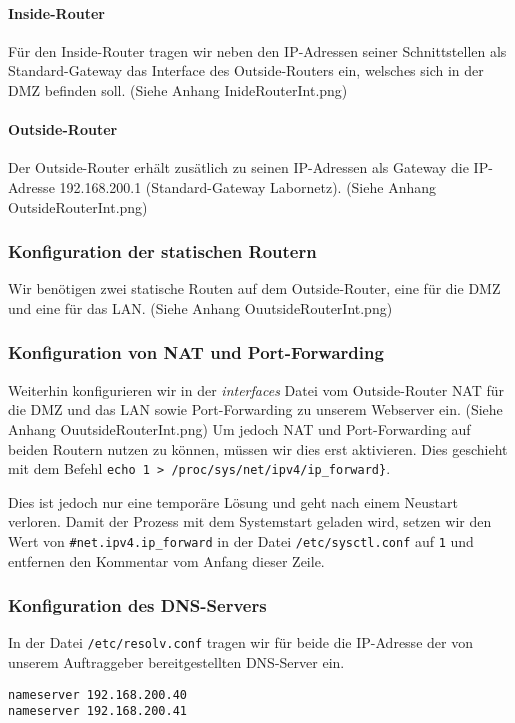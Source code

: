 \paragraph*{Inside-Router} Für den Inside-Router tragen wir neben den \ac{IP}-Adressen seiner Schnittstellen als Standard-Gateway das Interface des Outside-Routers ein, welsches sich in der \ac{DMZ} befinden soll. (Siehe Anhang InideRouterInt.png)

\paragraph*{Outside-Router} Der Outside-Router erhält zusätlich zu seinen \ac{IP}-Adressen als Gateway die \ac{IP}-Adresse 192.168.200.1 (Standard-Gateway Labornetz). (Siehe Anhang OutsideRouterInt.png)

\subsubsection{Konfiguration der statischen Routern}
\label{subsubsec:KonfigurationStatischeRouten}
Wir benötigen zwei statische Routen auf dem Outside-Router, eine für die \ac{DMZ} und eine für das \ac{LAN}. (Siehe Anhang OuutsideRouterInt.png)

\subsubsection{Konfiguration von \ac{NAT} und Port-Forwarding}
\label{subsubsec:KonfigurationNAT}
Weiterhin konfigurieren wir in der \textit{interfaces} Datei vom Outside-Router \ac{NAT} für die \ac{DMZ} und das \ac{LAN} sowie Port-Forwarding zu unserem Webserver ein. (Siehe Anhang OuutsideRouterInt.png)
Um jedoch \ac{NAT} und Port-Forwarding auf beiden Routern nutzen zu können, müssen wir dies erst aktivieren. Dies geschieht mit dem Befehl
\verb+echo 1 > /proc/sys/net/ipv4/ip_forward}+.

Dies ist jedoch nur eine temporäre Lösung und geht nach einem Neustart verloren. Damit der Prozess mit dem Systemstart geladen wird, setzen wir den Wert von  \verb+#net.ipv4.ip_forward+ in der Datei \texttt{/etc/sysctl.conf} auf \verb+1+ und entfernen den Kommentar vom Anfang dieser Zeile.

\subsubsection{Konfiguration des \ac{DNS}-Servers}
\label{subsubsec:KonfigurationLinuxDNS}
In der Datei \verb+/etc/resolv.conf+ tragen wir für beide die \ac{IP}-Adresse der von unserem Auftraggeber bereitgestellten \ac{DNS}-Server ein.
\begin{verbatim}
nameserver 192.168.200.40
nameserver 192.168.200.41
\end{verbatim}

